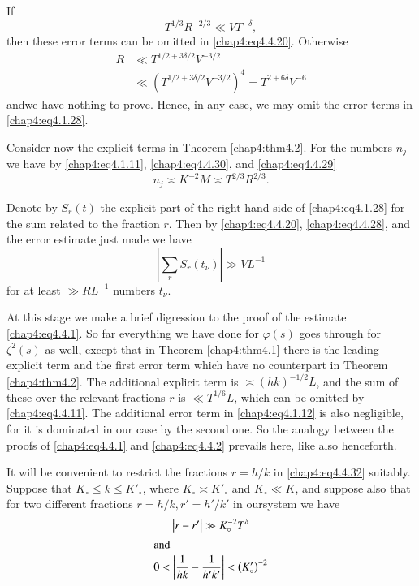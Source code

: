 If
$$
T^{1/3}R^{-2/3}\ll VT^{-\delta},
$$
then these error terms can be omitted in \eqref{chap4:eq4.4.20}. Otherwise
\begin{align*}
R &\ll T^{1/2+3\delta/2} V^{-3/2}\\
&\ll \left(T^{1/2+3\delta/2} V^{-3/2}\right)^4=T^{2+6\delta}V^{-6}
\end{align*}
and\pageoriginale we have nothing to prove. Hence, in any case, we may omit the error terms in \eqref{chap4:eq4.1.28}.

Consider now the explicit terms in Theorem \ref{chap4:thm4.2}. For the numbers $n_j$ we have by \eqref{chap4:eq4.1.11}, \eqref{chap4:eq4.4.30}, and \eqref{chap4:eq4.4.29}
\begin{equation}\label{chap4:eq4.4.31}
n_j\asymp K^{-2}M\asymp T^{2/3}R^{2/3}.
\end{equation}

Denote by $S_r(t)$ the explicit part of the right hand side of \eqref{chap4:eq4.1.28} for the sum related to the fraction $r$. Then by \eqref{chap4:eq4.4.20}, \eqref{chap4:eq4.4.28}, and the error estimate just made we have 
\begin{equation}\label{chap4:eq4.4.32}
\left|\sum\limits_r S_r(t_\nu)\right|\gg VL^{-1}
\end{equation}
for at least $\gg RL^{-1}$ numbers $t_\nu$.

At this stage we make a brief digression to the proof of the estimate \eqref{chap4:eq4.4.1}. So far everything we have done for $\varphi(s)$ goes through for $\zeta^2(s)$ as well, except that in Theorem \ref{chap4:thm4.1} there is the leading explicit term and the first error term which have no counterpart in Theorem \ref{chap4:thm4.2}. The additional explicit term is $\asymp(hk)^{-1/2}L$, and the sum of these over the relevant fractions $r$ is $\ll T^{1/6}L$, which can be omitted by \eqref{chap4:eq4.4.11}. The additional error term in \eqref{chap4:eq4.1.12} is also negligible, for it is dominated in our case by the second one. So the analogy between the proofs of \eqref{chap4:eq4.4.1} and \eqref{chap4:eq4.4.2} prevails here, like also henceforth.

It will be convenient to restrict the fractions $r=h/k$ in \eqref{chap4:eq4.4.32} suitably. Suppose that $K_\circ\leq k\leq K'_\circ$, where $K_\circ\asymp K'_\circ$ and $K_\circ\ll K$, and suppose also that for two different fractions $r=h/k, r'=h'/k'$ in our\pageoriginale system we have 
\begin{gather}
\left|r-r'\right|\gg K_\circ^{-2}T^\delta \label{chap4:eq4.4.33}\\
\intertext{and}
0<\left|\frac{1}{hk}-\frac{1}{h'k'}\right|<\left(K'_\circ \right)^{-2}\label{chap4:eq4.4.34}
\end{gather}

